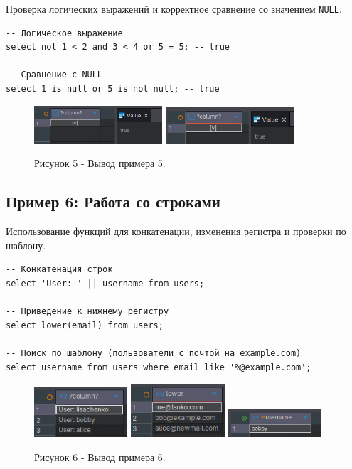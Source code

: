 \documentclass[oneside,a4paper,14pt]{extarticle}
\begin{document}
Проверка логических выражений и корректное сравнение со значением \texttt{NULL}.

\begin{verbatim}
-- Логическое выражение
select not 1 < 2 and 3 < 4 or 5 = 5; -- true

-- Сравнение с NULL
select 1 is null or 5 is not null; -- true
\end{verbatim}

\begin{figure}[H]
  \centering
  \includegraphics[width=0.425\textwidth]{pics/logic_1.png}
  \includegraphics[width=0.425\textwidth]{pics/logic_2.png}
  \caption*{Рисунок 5 - Вывод примера 5.}
\end{figure}

\subsection*{Пример 6: Работа со строками}

Использование функций для конкатенации, изменения регистра и проверки по шаблону.

\begin{verbatim}
-- Конкатенация строк
select 'User: ' || username from users;

-- Приведение к нижнему регистру
select lower(email) from users;

-- Поиск по шаблону (пользователи с почтой на example.com)
select username from users where email like '%@example.com';
\end{verbatim}

\begin{figure}[H]
  \centering
  \includegraphics[width=0.31\textwidth]{pics/string_1.png}
  \includegraphics[width=0.31\textwidth]{pics/string_2.png}
  \includegraphics[width=0.31\textwidth]{pics/string_3.png}
  \caption*{Рисунок 6 - Вывод примера 6.}
\end{figure}
\end{document}
